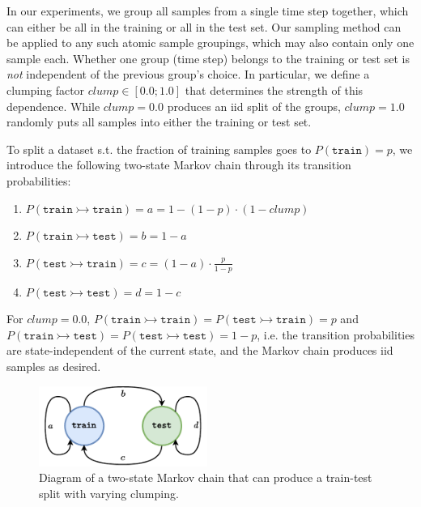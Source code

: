 In our experiments, we group all samples from a single time step together, which can either be all in the training or all in the test set. Our sampling method can be applied to any such atomic sample groupings, which may also contain only one sample each. Whether one group (time step) belongs to the training or test set is \textit{not} independent of the previous group's choice. In particular, we define a clumping factor $clump \in [0.0; 1.0]$ that determines the strength of this dependence. While $clump = 0.0$ produces an iid split of the groups, $clump = 1.0$ randomly puts all samples into either the training or test set.

\begin{multicols}{2}
    \noindent To split a dataset s.t. the fraction of training samples goes to $P(\texttt{train}) = p$, we introduce the following two-state Markov chain through its transition probabilities:
    \begin{enumerate}
        \item $P(\texttt{train} \rightarrowtail \texttt{train}) = a = 1 - (1-p) \cdot (1 - clump)$
        \item $P(\texttt{train} \rightarrowtail \texttt{test}) = b = 1-a$
        \item $P(\texttt{test} \rightarrowtail \texttt{train}) = c = (1-a) \cdot \frac{p}{1-p}$
        \item $P(\texttt{test} \rightarrowtail \texttt{test}) = d = 1-c$
    \end{enumerate}
    For $clump = 0.0$, $P(\texttt{train} \rightarrowtail \texttt{train}) = P(\texttt{test} \rightarrowtail \texttt{train}) = p$ and $P(\texttt{train} \rightarrowtail \texttt{test}) = P(\texttt{test} \rightarrowtail \texttt{test}) = 1-p$, i.e. the transition probabilities are state-independent of the current state, and the Markov chain produces iid samples as desired.
    \begin{figure}[H]
        \centering
        \includegraphics[width=0.49\textwidth]{prediction/figures/clumped-train-test.pdf}
        \caption[Clumped train-test split Markov chain]{Diagram of a two-state Markov chain that can produce a train-test split with varying clumping.}
        \label{fig:clumped-train-test}
    \end{figure}
\end{multicols}

